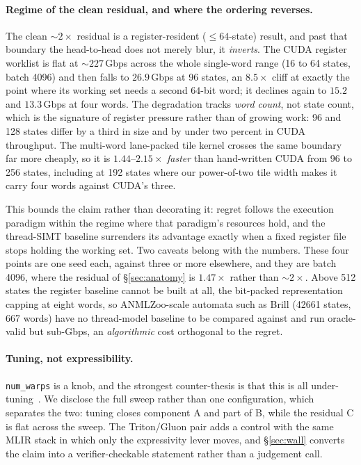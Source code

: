 \documentclass[sigplan,anonymous,review,nonacm,10pt]{acmart}
\begin{document}
\paragraph{Regime of the clean residual, and where the ordering reverses.} The clean
${\sim}2\times$ residual is a register-resident ($\le 64$-state) result, and past that
boundary the head-to-head does not merely blur, it \emph{inverts}. The CUDA register
worklist is flat at ${\sim}227$\,Gbps across the whole single-word range (16 to 64 states,
batch 4096) and then falls to $26.9$\,Gbps at 96 states, an $8.5\times$ cliff at exactly the
point where its working set needs a second $64$-bit word; it declines again to $15.2$ and
$13.3$\,Gbps at four words. The degradation tracks \emph{word count}, not state count,
which is the signature of register pressure rather than of growing work: 96 and 128 states
differ by a third in size and by under two percent in CUDA throughput. The
multi-word lane-packed tile kernel crosses the same boundary far more cheaply, so it is
$1.44$--$2.15\times$ \emph{faster} than hand-written CUDA from 96 to 256 states, including
at 192 states where our power-of-two tile width makes it carry four words against CUDA's
three.

This bounds the claim rather than decorating it: regret follows the execution paradigm
within the regime where that paradigm's resources hold, and the thread-SIMT baseline
surrenders its advantage exactly when a fixed register file stops holding the working set.
Two caveats belong with the numbers. These four points are one seed each, against three or
more elsewhere, and they are batch 4096, where the residual of \S\ref{sec:anatomy} is
$1.47\times$ rather than ${\sim}2\times$. Above 512 states the register baseline cannot be
built at all, the bit-packed representation capping at eight words, so ANMLZoo-scale
automata such as Brill (42661 states, 667 words) have no thread-model baseline to be
compared against and run oracle-valid but sub-Gbps, an \emph{algorithmic} cost orthogonal
to the regret.

\paragraph{Tuning, not expressibility.} \texttt{num\_warps} is a knob, and the strongest
counter-thesis is that this is all under-tuning~\cite{ringlein2025}. We disclose the full
sweep rather than one configuration, which separates the two: tuning closes component A and
part of B, while the residual C is flat across the sweep. The Triton/Gluon pair adds a
control with the same MLIR stack in which only the expressivity lever moves, and
\S\ref{sec:wall} converts the claim into a verifier-checkable statement rather than a
judgement call.
\end{document}
